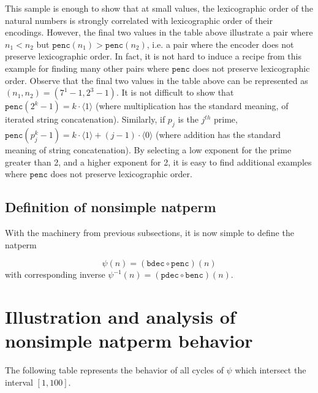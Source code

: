 \documentclass[12pt,reqno]{article}
\begin{document}
This sample is enough to show that at small values, the lexicographic order of the natural numbers is strongly correlated with lexicographic order of their encodings. However, the final two values in the table above illustrate a pair where $n_1 < n_2$ but $\texttt{penc}(n_1) > \texttt{penc}(n_2)$, i.e. a pair where the encoder does not preserve lexicographic order. In fact, it is not hard to induce a recipe from this example for finding many other pairs where $\texttt{penc}$ does not preserve lexicographic order. Observe that the final two values in the table above can be represented as $(n_1, n_2) = (7^1 - 1, 2^3 - 1)$. It is not difficult to show that $\texttt{penc}(2^k - 1) = k \cdot \langle 1 \rangle$ (where multiplication has the standard meaning, of iterated string concatenation). Similarly, if $p_j$ is the $j^{th}$ prime, $\texttt{penc}(p_j^k - 1) = k \cdot \langle 1 \rangle + (j - 1) \cdot \langle 0 \rangle$ (where addition has the standard meaning of string concatenation). By selecting a low exponent for the prime greater than 2, and a higher exponent for 2, it is easy to find additional examples where $\texttt{penc}$ does not preserve lexicographic order.

\subsection{Definition of nonsimple natperm}

With the machinery from previous subsections, it is now simple to define the natperm

\begin{equation}
    \psi(n) = ( \texttt{bdec} \circ \texttt{penc} ) (n)
\end{equation}
with corresponding inverse $\psi^{-1}(n) = ( \texttt{pdec}  \circ \texttt{benc} ) (n)$.

\section{Illustration and analysis of nonsimple natperm behavior}

The following table represents the behavior of all cycles of $\psi$ which intersect the interval $ [ 1, 100 ] $. 
\end{document}
